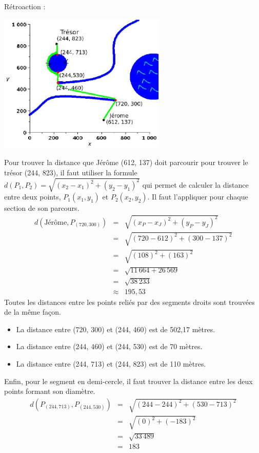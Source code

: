 \documentclass[letterpaper, 12pt]{article}
\begin{document}
R\'etroaction :\\
\begin{center}
 \includegraphics[width=8cm,bb=14 14 259 217]{Q2453r.eps}
\end{center}
Pour trouver la distance que J\'er\^ome (612, 137) doit parcourir pour trouver le tr\'esor (244, 823), il faut utiliser la formule $d(P_{1}, P_{2})=\sqrt{(x_{2}-x_{1})^{2}+(y_{2}-y_{1})^{2}}$ qui permet de calculer la distance entre deux points, $P_{1}(x_{1},y_{1})$ et $P_{2}(x_{2},y_{2})$. Il faut l'appliquer pour chaque section de son parcours.
\begin{eqnarray*}
 d(\textrm{J\'er\^ome}, P_{(720, 300)})&=&\sqrt{(x_{P}-x_{J})^{2}+(y_{P}-y_{J})^{2}}\\
&=&\sqrt{(720-612)^{2}+(300-137)^{2}}\\
&=&\sqrt{(108)^{2}+(163)^{2}}\\
&=&\sqrt{11\,664+26\,569}\\
&=&\sqrt{38\,233}\\
&\approx&195,53
\end{eqnarray*}
Toutes les distances entre les points reli\'es par des segments droits sont trouv\'ees de la m\^eme fa\c con.
\begin{itemize}
 \item La distance entre (720, 300) et (244, 460) est de 502,17 m\`etres.
\item La distance entre (244, 460) et (244, 530) est de  70 m\`etres.
\item La distance entre (244, 713) et (244, 823) est de 110 m\`etres.\\
\end{itemize}
Enfin, pour le segment en demi-cercle, il faut trouver la distance entre les deux points formant son diam\`etre.
\begin{eqnarray*}
  d(P_{(244, 713)}, P_{(244, 530)})&=&\sqrt{(244-244)^{2}+(530-713)^{2}}\\
&=&\sqrt{(0)^{2}+(-183)^{2}}\\
&=&\sqrt{33\,489}\\
&=&183
\end{eqnarray*}
\end{document}
